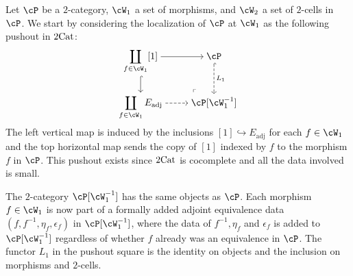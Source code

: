 \documentclass[11pt, dvipsnames]{amsart}
\begin{document}
\begin{constr}\label{constr:pushout_localization}
    Let $\cP$ be a $2$-category, $\cW_1$ a set of morphisms, and $\cW_2$ a set of $2$-cells in $\cP$. We start by considering the localization of $\cP$ at $\cW_1$ as the following pushout in $2\mathrm{Cat}$:
	\[\begin{tikzcd}[ampersand replacement=\&,cramped]
		{\displaystyle\coprod_{f \in \cW_1} [1]} \& \cP \\
		{\displaystyle\coprod_{f \in \cW_1} E_{\mathrm{adj}}} \& {\cP[\cW_1^{-1}]}
		\arrow[from=1-1, to=1-2]
		\arrow[hook, from=1-1, to=2-1]
		\arrow["{L_1}", dashed, hook, from=1-2, to=2-2]
		\arrow[dashed, from=2-1, to=2-2]
		\arrow["\lrcorner"{anchor=center, pos=0.125, rotate=180}, draw=none, from=2-2, to=1-1]
	\end{tikzcd}\]
	The left vertical map is induced by the inclusions $[1] \hookrightarrow E_{\mathrm{adj}}$ for each $f \in \cW_1$ and the top horizontal map sends the copy of $[1]$ indexed by $f$ to the morphism $f$ in $\cP$. This pushout exists since $2\mathrm{Cat}$ is cocomplete and all the data involved is small. 

	The $2$-category $\cP[\cW_1^{-1}]$ has the same objects as $\cP$. Each morphism $f \in \cW_1$ is now part of a formally added adjoint equivalence data $(f, f^{-1}, \eta_f, \epsilon_f)$ in $\cP[\cW_1^{-1}]$, where the data of $f^{-1},\eta_f$ and $\epsilon_f$ is added to $\cP[\cW_1^{-1}]$ regardless of whether $f$ already was an equivalence in $\cP$. The functor $L_1$ in the pushout square is the identity on objects and the inclusion on morphisms and $2$-cells. 
    

\end{constr}
\end{document}
